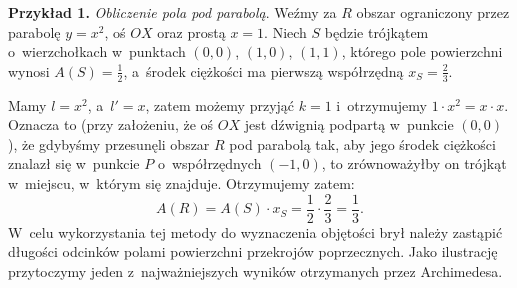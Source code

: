{\bf Przykład 1.} {\it Obliczenie pola pod parabolą}. Weźmy za $R$
obszar ograniczony przez parabolę $y=x^2$, oś $OX$ oraz prostą $x=1$. Niech $S$
będzie trójkątem o~wierzchołkach w~punktach $(0,0)$, $(1,0)$, $(1,1)$, którego
pole powierzchni wynosi $A(S)=\frac{1}{2}$, a~środek ciężkości ma pierwszą
współrzędną $x_{S}=\frac{2}{3}$. 

Mamy $l=x^2$, a~$l'=x$, zatem możemy przyjąć $k=1$ i~otrzymujemy $1 \cdot x^2=x \cdot x$. Oznacza to (przy założeniu, że oś $OX$ jest dźwignią podpartą w~punkcie $(0,0)$), że gdybyśmy przesunęli obszar $R$ pod parabolą tak, aby jego środek ciężkości znalazł się w~punkcie $P$ o~współrzędnych $(-1,0)$, to zrównoważyłby on trójkąt w~miejscu, w~którym się znajduje. Otrzymujemy zatem:
\begin{equation*}
A(R) = A(S) \cdot x_S = \frac{1}{2} \cdot \frac{2}{3} = \frac{1}{3}.
\end{equation*}
W~celu wykorzystania tej metody do wyznaczenia objętości brył należy zastąpić długości odcinków polami powierzchni przekrojów poprzecznych. Jako ilustrację przytoczymy jeden z~najważniejszych wyników otrzymanych przez Archimedesa.

